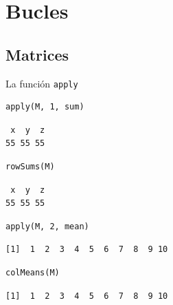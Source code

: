 \documentclass[xcolor={usenames,svgnames,dvipsnames}]{beamer}
\begin{document}
\section{Bucles}
\label{sec:org72dab04}
\subsection{Matrices}
\label{sec:org75de290}
\begin{frame}[fragile,label={sec:org8b62386}]{La función \texttt{apply}}
 \lstset{language=r,label= ,caption= ,captionpos=b,numbers=none}
\begin{lstlisting}
apply(M, 1, sum)
\end{lstlisting}

\begin{verbatim}
 x  y  z 
55 55 55
\end{verbatim}

\lstset{language=r,label= ,caption= ,captionpos=b,numbers=none}
\begin{lstlisting}
rowSums(M)
\end{lstlisting}

\begin{verbatim}
 x  y  z 
55 55 55
\end{verbatim}

\lstset{language=r,label= ,caption= ,captionpos=b,numbers=none}
\begin{lstlisting}
apply(M, 2, mean)
\end{lstlisting}

\begin{verbatim}
[1]  1  2  3  4  5  6  7  8  9 10
\end{verbatim}

\lstset{language=r,label= ,caption= ,captionpos=b,numbers=none}
\begin{lstlisting}
colMeans(M)
\end{lstlisting}

\begin{verbatim}
[1]  1  2  3  4  5  6  7  8  9 10
\end{verbatim}
\end{frame}
\end{document}

